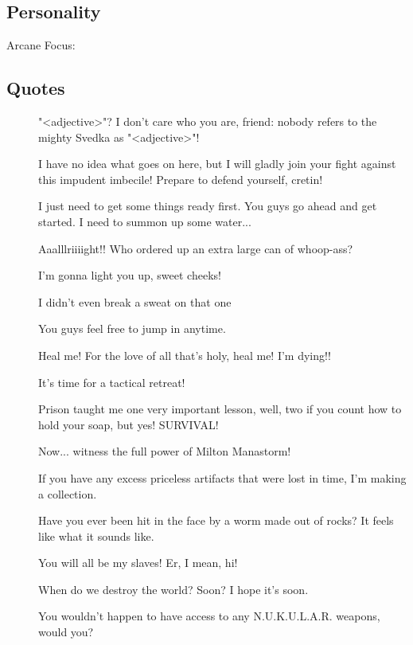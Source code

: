 \documentclass[letterpaper,10pt,twoside,twocolumn,openany]{book}
\begin{document}
\subsection{Personality}

\begin{description}
	\item[Arcane Focus:]
\end{description}

\subsection{Quotes}

\begin{description}
	\item[] "<adjective>"? I don't care who you are, friend: nobody refers to the mighty Svedka as "<adjective>"!
	\item[] I have no idea what goes on here, but I will gladly join your fight against this impudent imbecile! Prepare to defend yourself, cretin!
	\item[] I just need to get some things ready first. You guys go ahead and get started. I need to summon up some water...
	\item[] Aaalllriiiight!! Who ordered up an extra large can of whoop-ass?
	\item[] I'm gonna light you up, sweet cheeks!
	\item[] I didn't even break a sweat on that one
	\item[] You guys feel free to jump in anytime.
	\item[] Heal me! For the love of all that's holy, heal me! I'm dying!!
	\item[] It's time for a tactical retreat!
	\item[] Prison taught me one very important lesson, well, two if you count how to hold your soap, but yes! SURVIVAL!
	\item[] Now... witness the full power of Milton Manastorm!
	\item[] If you have any excess priceless artifacts that were lost in time, I'm making a collection.
	\item[] Have you ever been hit in the face by a worm made out of rocks? It feels like what it sounds like.
	\item[] You will all be my slaves! Er, I mean, hi!
	\item[] When do we destroy the world? Soon? I hope it's soon.
	\item[] You wouldn't happen to have access to any N.U.K.U.L.A.R. weapons, would you?

\end{description}
\end{document}
